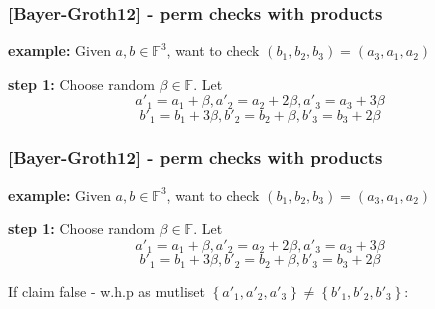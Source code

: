\documentclass[shadesubsections,trans,14pt,mathserif]{beamer}
\newcommand{\F}{\ensuremath{\mathbb F}}
\newcommand{\set}[1]{\ensuremath{\left\{#1\right\}}}
\begin{document}
\begin{frame}
\frametitle{{\normalsize{[Bayer-Groth12]}} - perm checks with products}   %
\textbf{example:} Given $a,b\in \F^3$, want to check $(b_1,b_2,b_3) = (a_3,a_1,a_2)$ \\
 \vspace{0.2in}

\textbf{step 1:} Choose random $\beta\in \F$. Let
 \[a'_1 = a_1 + \beta, a'_2 = a_2 + 2\beta, a'_3 = a_3 + 3\beta\]
 \[b'_1 = b_1 + 3\beta, b'_2 = b_2 + \beta, b'_3 = b_3 + 2\beta\]

 
 \vspace{0.2in}


\end{frame}
\begin{frame}
\frametitle{{\normalsize{[Bayer-Groth12]}} - perm checks with products}   %
\textbf{example:} Given $a,b\in \F^3$, want to check $(b_1,b_2,b_3) = (a_3,a_1,a_2)$ \\
 \vspace{0.2in}

\textbf{step 1:} Choose random $\beta\in \F$. Let
 \[a'_1 = a_1 + \beta, a'_2 = a_2 + 2\beta, a'_3 = a_3 + 3\beta\]
 \[b'_1 = b_1 + 3\beta, b'_2 = b_2 + \beta, b'_3 = b_3 + 2\beta\]

 
 \vspace{0.2in}

If claim false - w.h.p as mutliset $\set{a'_1,a'_2,a'_3}\neq \set{b'_1,b'_2,b'_3}$:

\end{frame}
\end{document}
